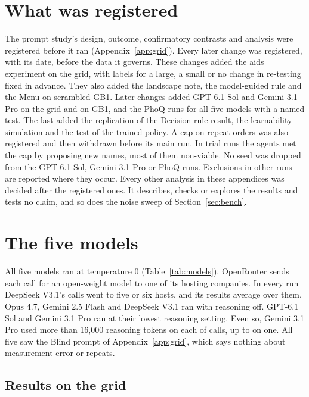 \section{What was registered}
\label{app:amendments}

The prompt study's design, outcome, confirmatory contrasts and analysis were registered before it ran
(Appendix~\ref{app:grid}). Every later change was registered, with its date, before the data it governs. These changes added the aids experiment on the grid, with labels for a large, a small or no change in re-testing fixed in advance. They also added the landscape note, the model-guided rule and the Menu on scrambled GB1. Later changes added GPT-6.1 Sol and Gemini 3.1 Pro on the grid and on GB1, and the PhoQ runs for all five models with a named test. The last added the replication of the Decision-rule result, the learnability simulation and the test of the trained policy. A cap on repeat orders was also registered and then withdrawn before its main run. In trial runs the agents met the
cap by proposing new names, most of them non-viable. No seed was dropped from the GPT-6.1 Sol, Gemini 3.1 Pro or PhoQ runs. Exclusions in other runs are reported where they occur.
Every other analysis in these appendices was decided after the registered ones. It describes, checks or explores
the results and tests no claim, and so does the noise sweep of Section~\ref{sec:bench}.

\section{The five models}
\label{app:comparators}
All five models ran at temperature 0 (Table~\ref{tab:models}). OpenRouter sends each call for an open-weight
model to one of its hosting companies. In every run DeepSeek V3.1's calls went to five or six hosts, and its
results average over them. Opus 4.7, Gemini 2.5 Flash and DeepSeek V3.1 ran with
reasoning off. GPT-6.1 Sol and Gemini 3.1 Pro ran at their lowest reasoning setting. Even so, Gemini 3.1 Pro used more than 16{,}000 reasoning tokens on each of \nProHeavyCalls{} calls, up to \nProMaxReasoning{} on one. All five saw the Blind prompt of Appendix~\ref{app:grid}, which says nothing about measurement error or repeats.



\subsection{Results on the grid}

